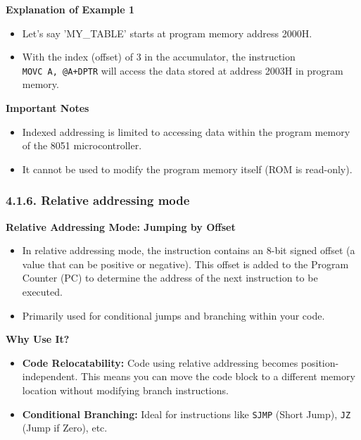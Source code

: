 \documentclass[
]{article}
\begin{document}
\textbf{Explanation of Example 1}

\begin{itemize}
\item
  Let's say 'MY\_TABLE' starts at program memory address 2000H.
\item
  With the index (offset) of 3 in the accumulator, the instruction
  \texttt{MOVC\ A,\ @A+DPTR} will access the data stored at address
  2003H in program memory.
\end{itemize}

\textbf{Important Notes}

\begin{itemize}
\item
  Indexed addressing is limited to accessing data within the program
  memory of the 8051 microcontroller.
\item
  It cannot be used to modify the program memory itself (ROM is
  read-only).
\end{itemize}

\hypertarget{416-relative-addressing-mode}{%
\subsubsection{4.1.6. Relative addressing
mode}\label{416-relative-addressing-mode}}

\textbf{Relative Addressing Mode: Jumping by Offset}

\begin{itemize}
\item
  In relative addressing mode, the instruction contains an 8-bit signed
  offset (a value that can be positive or negative). This offset is
  added to the Program Counter (PC) to determine the address of the next
  instruction to be executed.
\item
  Primarily used for conditional jumps and branching within your code.
\end{itemize}

\textbf{Why Use It?}

\begin{itemize}
\item
  \textbf{Code Relocatability:} Code using relative addressing becomes
  position-independent. This means you can move the code block to a
  different memory location without modifying branch instructions.
\item
  \textbf{Conditional Branching:} Ideal for instructions like
  \texttt{SJMP} (Short Jump), \texttt{JZ} (Jump if Zero), etc.
\end{itemize}
\end{document}
